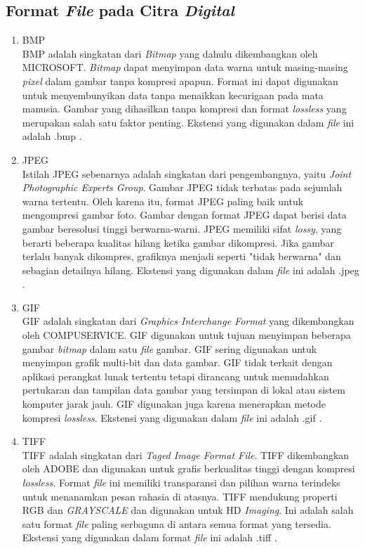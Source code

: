 	\subsection{Format \emph{File} pada Citra \emph{Digital}}
		\begin{enumerate}
			\item BMP\\
			BMP adalah singkatan dari \emph{Bitmap} yang dahulu dikembangkan oleh MICROSOFT. \emph{Bitmap} dapat menyimpan data warna untuk masing-masing \emph{pixel} dalam gambar tanpa kompresi apapun. Format ini dapat digunakan untuk menyembunyikan data tanpa menaikkan kecurigaan pada mata manusia. Gambar yang dihasilkan tanpa kompresi dan format \emph{lossless} yang merupakan salah satu faktor penting. Ekstensi yang digunakan dalam \emph{file} ini adalah .bmp \cite{gautam}.
			\item JPEG\\
			Istilah JPEG sebenarnya adalah singkatan dari pengembangnya, yaitu \emph{Joint Photographic Experts Group}. Gambar JPEG tidak terbatas pada sejumlah warna tertentu. Oleh karena itu, format JPEG paling baik untuk mengompresi gambar foto. Gambar dengan format JPEG dapat berisi data gambar beresolusi tinggi berwarna-warni. JPEG memiliki sifat \emph{lossy}, yang berarti beberapa kualitas hilang ketika gambar dikompresi. Jika gambar terlalu banyak dikompres, grafiknya menjadi seperti "tidak berwarna" dan sebagian detailnya hilang. Ekstensi yang digunakan dalam \emph{file} ini adalah .jpeg \cite{elgabar}.
			\item GIF\\
			GIF adalah singkatan dari \emph{Graphics Interchange Format} yang dikembangkan oleh COMPUSERVICE. GIF digunakan untuk tujuan menyimpan beberapa gambar \emph{bitmap} dalam satu \emph{file} gambar. GIF sering digunakan untuk menyimpan grafik multi-bit dan data gambar. GIF tidak terkait dengan aplikasi perangkat lunak tertentu tetapi dirancang untuk memudahkan pertukaran dan tampilan data gambar yang tersimpan di lokal atau sistem komputer jarak jauh. GIF digunakan juga karena menerapkan metode kompresi \emph{lossless}. Ekstensi yang digunakan dalam \emph{file} ini adalah .gif \cite{elgabar2}.
			\item TIFF\\
			TIFF adalah singkatan dari \emph{Taged Image Format File}. TIFF dikembangkan oleh ADOBE dan digunakan untuk grafis berkualitas tinggi dengan kompresi \emph{lossless}. Format \emph{file} ini memiliki transparansi dan pilihan warna terindeks untuk menanamkan pesan rahasia di atasnya. TIFF mendukung properti RGB dan \emph{GRAYSCALE} dan digunakan untuk HD \emph{Imaging}. Ini adalah salah satu format \emph{file} paling serbaguna di antara semua format yang tersedia. Ekstensi yang digunakan dalam format \emph{file} ini adalah .tiff \cite{gautam}.

\end{enumerate}
